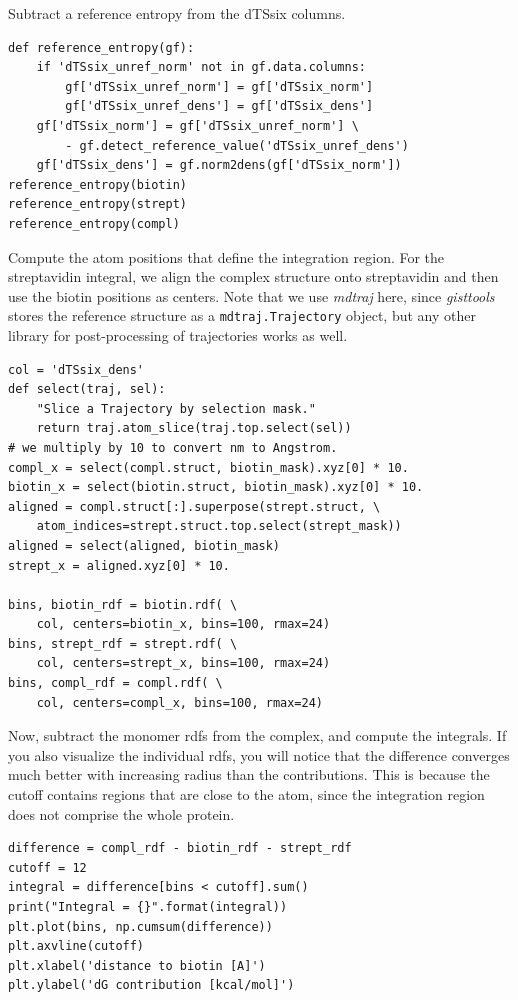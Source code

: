\documentclass[9pt,tutorial]{livecoms}
\newcommand{\software}{\emph}
\newcommand\inlinecode{\texttt}
\begin{document}
Subtract a reference entropy from the dTSsix columns.
\begin{lstlisting}[style=python]
def reference_entropy(gf):
    if 'dTSsix_unref_norm' not in gf.data.columns:
        gf['dTSsix_unref_norm'] = gf['dTSsix_norm']
        gf['dTSsix_unref_dens'] = gf['dTSsix_dens']
    gf['dTSsix_norm'] = gf['dTSsix_unref_norm'] \
        - gf.detect_reference_value('dTSsix_unref_dens')
    gf['dTSsix_dens'] = gf.norm2dens(gf['dTSsix_norm'])
reference_entropy(biotin)
reference_entropy(strept)
reference_entropy(compl)
\end{lstlisting}

Compute the atom positions that define the integration region.
For the streptavidin integral, we align the complex structure onto streptavidin and then use the biotin positions as centers.
Note that we use \software{mdtraj} here, since \software{gisttools} stores the reference structure as a \inlinecode{mdtraj.Trajectory} object, but any other library for post-processing of trajectories works as well.
\begin{lstlisting}[style=python]
col = 'dTSsix_dens'
def select(traj, sel):
    "Slice a Trajectory by selection mask."
    return traj.atom_slice(traj.top.select(sel))
# we multiply by 10 to convert nm to Angstrom.
compl_x = select(compl.struct, biotin_mask).xyz[0] * 10.
biotin_x = select(biotin.struct, biotin_mask).xyz[0] * 10.
aligned = compl.struct[:].superpose(strept.struct, \
    atom_indices=strept.struct.top.select(strept_mask))
aligned = select(aligned, biotin_mask)
strept_x = aligned.xyz[0] * 10.

bins, biotin_rdf = biotin.rdf( \
    col, centers=biotin_x, bins=100, rmax=24)
bins, strept_rdf = strept.rdf( \
    col, centers=strept_x, bins=100, rmax=24)
bins, compl_rdf = compl.rdf( \
    col, centers=compl_x, bins=100, rmax=24)
\end{lstlisting}

Now, subtract the monomer rdfs from the complex, and compute the integrals.
If you also visualize the individual rdfs, you will notice that the difference converges much better with increasing radius than the contributions.
This is because the cutoff contains regions that are close to the atom, since the integration region does not comprise the whole protein.
\begin{lstlisting}[style=python]
difference = compl_rdf - biotin_rdf - strept_rdf
cutoff = 12
integral = difference[bins < cutoff].sum()
print("Integral = {}".format(integral))
plt.plot(bins, np.cumsum(difference))
plt.axvline(cutoff)
plt.xlabel('distance to biotin [A]')
plt.ylabel('dG contribution [kcal/mol]')
\end{lstlisting}
\end{document}
